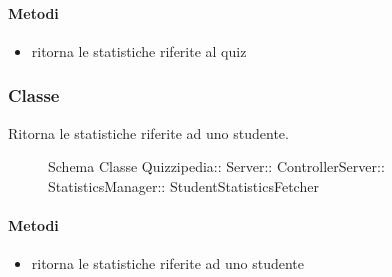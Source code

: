 \paragraph{Metodi}
\begin{itemize}
\item {}
\newline
ritorna le statistiche riferite al quiz
\newline
\end{itemize}
\subsubsection{Classe }
Ritorna le statistiche riferite ad uno studente.
\begin{figure}[H]
\centering
\noindent{}
\caption[Schema Classe StudentStatisticsFetcher]{Schema Classe Quizzipedia:: Server:: ControllerServer:: StatisticsManager:: StudentStatisticsFetcher}
\end{figure}
\paragraph{Metodi}
\begin{itemize}
\item {}
\newline
ritorna le statistiche riferite ad uno studente
\newline
\end{itemize}
